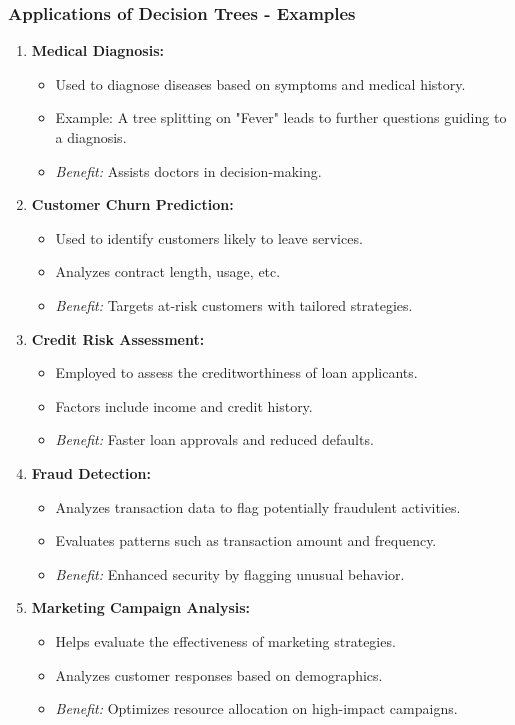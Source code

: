 \documentclass[aspectratio=169]{beamer}
\begin{document}
\begin{frame}[fragile]
  \frametitle{Applications of Decision Trees - Examples}
  \begin{enumerate}
    \item \textbf{Medical Diagnosis:}
      \begin{itemize}
        \item Used to diagnose diseases based on symptoms and medical history.
        \item Example: A tree splitting on "Fever" leads to further questions guiding to a diagnosis.
        \item \textit{Benefit:} Assists doctors in decision-making.
      \end{itemize}
      
    \item \textbf{Customer Churn Prediction:}
      \begin{itemize}
        \item Used to identify customers likely to leave services.
        \item Analyzes contract length, usage, etc.
        \item \textit{Benefit:} Targets at-risk customers with tailored strategies.
      \end{itemize}

    \item \textbf{Credit Risk Assessment:}
      \begin{itemize}
        \item Employed to assess the creditworthiness of loan applicants.
        \item Factors include income and credit history.
        \item \textit{Benefit:} Faster loan approvals and reduced defaults.
      \end{itemize}

    \item \textbf{Fraud Detection:}
      \begin{itemize}
        \item Analyzes transaction data to flag potentially fraudulent activities.
        \item Evaluates patterns such as transaction amount and frequency.
        \item \textit{Benefit:} Enhanced security by flagging unusual behavior.
      \end{itemize}

    \item \textbf{Marketing Campaign Analysis:}
      \begin{itemize}
        \item Helps evaluate the effectiveness of marketing strategies.
        \item Analyzes customer responses based on demographics.
        \item \textit{Benefit:} Optimizes resource allocation on high-impact campaigns.
      \end{itemize}
  \end{enumerate}
\end{frame}
\end{document}
